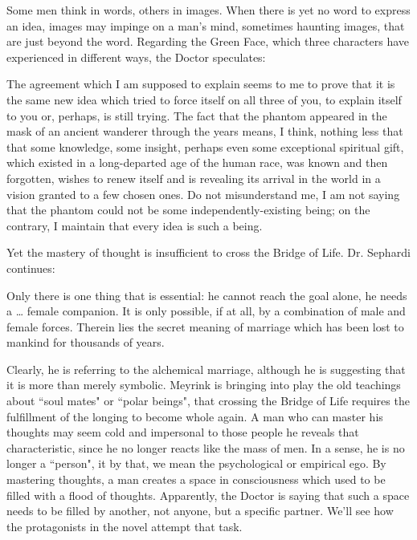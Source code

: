 Some men think in words, others in images. When there is yet no word to express an idea, images may impinge on a man's mind, sometimes haunting images, that are just beyond the word. Regarding the Green Face, which three characters have experienced in different ways, the Doctor speculates:

\begin{quotex}
The agreement which I am supposed to explain seems to me to prove that it is the same new idea which tried to force itself on all three of you, to explain itself to you or, perhaps, is still trying. The fact that the phantom appeared in the mask of an ancient wanderer through the years means, I think, nothing less that that some knowledge, some insight, perhaps even some exceptional spiritual gift, which existed in a long-departed age of the human race, was known and then forgotten, wishes to renew itself and is revealing its arrival in the world in a vision granted to a few chosen ones. Do not misunderstand me, I am not saying that the phantom could not be some independently-existing being; on the contrary, I maintain that every idea is such a being. 

\end{quotex}
Yet the mastery of thought is insufficient to cross the Bridge of Life. Dr. Sephardi continues:

\begin{quotex}
Only there is one thing that is essential: he cannot reach the goal alone, he needs a … female companion. It is only possible, if at all, by a combination of male and female forces. Therein lies the secret meaning of marriage which has been lost to mankind for thousands of years. 

\end{quotex}
Clearly, he is referring to the alchemical marriage, although he is suggesting that it is more than merely symbolic. Meyrink is bringing into play the old teachings about ``soul mates" or ``polar beings", that crossing the Bridge of Life requires the fulfillment of the longing to become whole again. A man who can master his thoughts may seem cold and impersonal to those people he reveals that characteristic, since he no longer reacts like the mass of men. In a sense, he is no longer a ``person", it by that, we mean the psychological or empirical ego. By mastering thoughts, a man creates a space in consciousness which used to be filled with a flood of thoughts. Apparently, the Doctor is saying that such a space needs to be filled by another, not anyone, but a specific partner. We'll see how the protagonists in the novel attempt that task.

